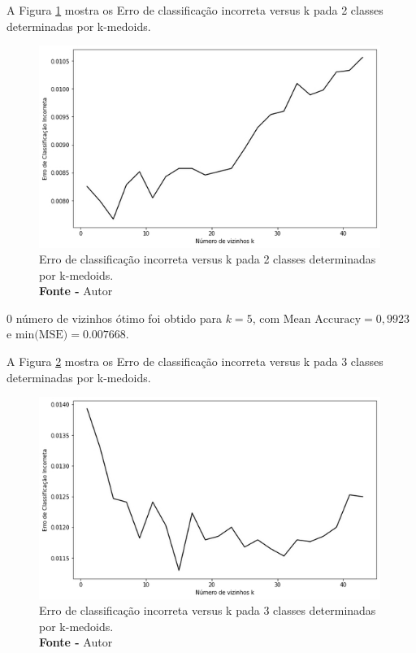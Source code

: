 A Figura \ref{fig: Erro de classificação incorreta versus k pada 2 classes determinadas por k-medoids} mostra os Erro de classificação incorreta versus k pada 2 classes determinadas por k-medoids.
\begin{figure}[H]
    \centering
    \includegraphics[width=0.99\textwidth]{Figuras/4. Resultados e Discussões/Exer4/Erro de classificação incorreta versus k pada 2 classes determinadas por k-medoids.jpg}
    \caption{Erro de classificação incorreta versus k pada 2 classes determinadas por k-medoids.\\ \textbf{Fonte -} Autor}
    \label{fig: Erro de classificação incorreta versus k pada 2 classes determinadas por k-medoids}
\end{figure}

0 número de vizinhos ótimo foi obtido para $k = 5$, com $\text{Mean Accuracy} = 0,9923$ e $\text{min(MSE)} = 0.007668$.

A Figura \ref{fig: Erro de classificação incorreta versus k pada 3 classes determinadas por k-medoids} mostra os Erro de classificação incorreta versus k pada 3 classes determinadas por k-medoids.
\begin{figure}[H]
    \centering
    \includegraphics[width=0.99\textwidth]{Figuras/4. Resultados e Discussões/Exer4/Erro de classificação incorreta versus k pada 3 classes determinadas por k-medoids.jpg}
    \caption{Erro de classificação incorreta versus k pada 3 classes determinadas por k-medoids.\\ \textbf{Fonte -} Autor}
    \label{fig: Erro de classificação incorreta versus k pada 3 classes determinadas por k-medoids}
\end{figure}

